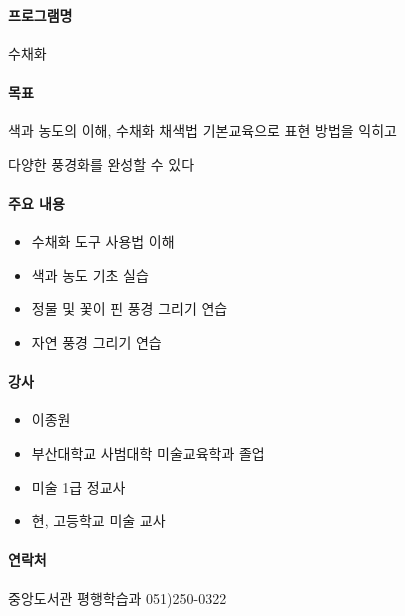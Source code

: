 \documentclass[12pt, a4paper, oneside]{book}
\begin{document}
\paragraph{ 프로그램명}
수채화

\paragraph{ 목표}

색과 농도의 이해, 수채화 채색법 기본교육으로 표현 방법을 익히고

다양한 풍경화를 완성할 수 있다

\paragraph{  주요 내용}


\begin{itemize}[					
		topsep=0.0em,			
		parsep=0.0em,			
		itemsep=0em,			
		leftmargin=	3	em,
		labelwidth=	1	em,			
		labelsep=		1	 em			
]					
	\item	수채화 도구 사용법 이해
	\item	색과 농도 기초 실습
	\item	정물 및 꽃이 핀 풍경 그리기 연습
	\item	자연 풍경 그리기 연습

\end{itemize}		


\paragraph{  강사}

\begin{itemize}[					
		topsep=0.0em,			
		parsep=0.0em,			
		itemsep=0em,			
		leftmargin=	3	em,
		labelwidth=	1	em,			
		labelsep=		1	 em			
]					
	\item	이종원
	\item	부산대학교 사범대학 미술교육학과 졸업
	\item	미술 1급 정교사
	\item	현, 고등학교 미술 교사

\end{itemize}		



\paragraph{  연락처 }

	중앙도서관 평행학습과 051)250-0322
\end{document}
